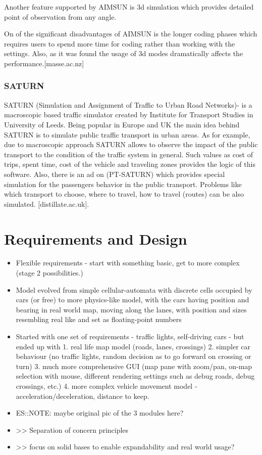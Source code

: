 Another feature  supported by AIMSUN is 3d simulation which provides detailed point of observation from any angle.

On of the significant disadvantages of AIMSUN is the longer coding phases which
requires users to spend more time for coding rather than working with the settings.
Also, as it was found the usage of 3d modes dramatically affects the performance.[masse.ac.nz]

\subsubsection{SATURN}

SATURN (Simulation and Assignment of Traffic to Urban Road Networks)- is a macroscopic based traffic simulator created by
Institute for Transport Studies in University of Leeds. Being popular in Europe and UK the main idea behind SATURN is to simulate public traffic transport in urban areas.
As for example, due to macroscopic approach SATURN allows to observe the impact of the public transport to the condition of the traffic
system in general. Such  values as cost of trips, spent time, cost of the vehicle and traveling zones provides the logic of this software.
Also, there is an ad on  (PT-SATURN) which provides special simulation for the passengers behavior in the public transport.
Problems like which transport to choose, where to travel, how to travel (routes)
can be also simulated. [distillate.ac.uk].

\section{Requirements and Design}
\begin{itemize}
    \item Flexible requirements - start with something basic, get to more complex (stage 2 possibilities.)
    \item Model evolved from simple cellular-automata with discrete cells occupied by cars (or free) to more physics-like model, with the cars having position and bearing in real world map, moving along the lanes, with position and sizes resembling real like and set as floating-point numbers
    \item Started with one set of requirements - traffic lights, self-driving cars - but ended up with 1. real life map model (roads, lanes, crossings) 2. simpler car behaviour (no traffic lights, random decision as to go forward on crossing or turn) 3. much more comprehensive GUI (map pane with zoom/pan, on-map selection with mouse, different rendering settings such as debug roads, debug crossings, etc.) 4. more complex vehicle movement model - acceleration/deceleration, distance to keep.
	\item ES::NOTE: maybe original pic of the 3 modules here?
	\item >> Separation of concern principles
	\item >> focus on solid bases to enable expandability and real world usage?
\end{itemize}

